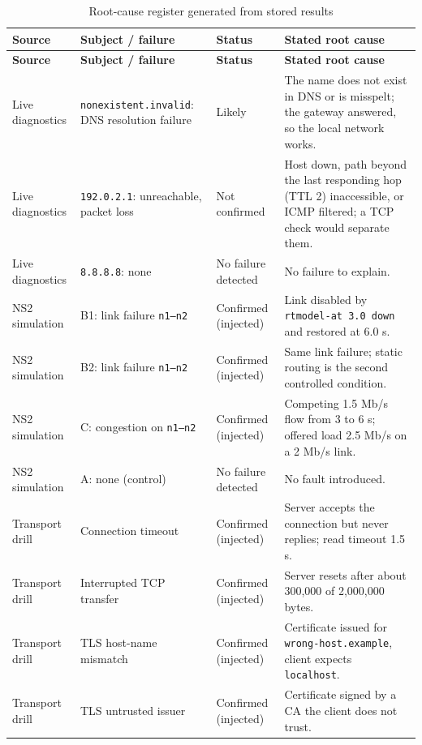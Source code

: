 \documentclass[12pt,a4paper]{report}
\numberwithin{equation}{chapter}
\begin{document}
\begin{longtable}{>{\raggedright\arraybackslash}p{}>{\raggedright\arraybackslash}p{}>{\raggedright\arraybackslash}p{}>{\raggedright\arraybackslash}p{}}
\caption{Root-cause register generated from stored results}\label{tab:register}\\
\toprule
\textbf{Source} & \textbf{Subject / failure} & \textbf{Status} & \textbf{Stated root cause}\\
\midrule
\endfirsthead
\toprule
\textbf{Source} & \textbf{Subject / failure} & \textbf{Status} & \textbf{Stated root cause}\\
\midrule
\endhead
Live diagnostics & \nolinkurl{nonexistent.invalid}: DNS resolution failure & Likely & The name does not exist in DNS or is misspelt; the gateway answered, so the local network works.\\
Live diagnostics & \texttt{192.0.2.1}: unreachable, packet loss & Not confirmed & Host down, path beyond the last responding hop (TTL 2) inaccessible, or ICMP filtered; a TCP check would separate them.\\
Live diagnostics & \texttt{8.8.8.8}: none & No failure detected & No failure to explain.\\
NS2 simulation & B1: link failure \texttt{n1--n2} & Confirmed (injected) & Link disabled by \texttt{rtmodel-at 3.0 down} and restored at 6.0 s.\\
NS2 simulation & B2: link failure \texttt{n1--n2} & Confirmed (injected) & Same link failure; static routing is the second controlled condition.\\
NS2 simulation & C: congestion on \texttt{n1--n2} & Confirmed (injected) & Competing 1.5 Mb/s flow from 3 to 6 s; offered load 2.5 Mb/s on a 2 Mb/s link.\\
NS2 simulation & A: none (control) & No failure detected & No fault introduced.\\
Transport drill & Connection timeout & Confirmed (injected) & Server accepts the connection but never replies; read timeout 1.5 s.\\
Transport drill & Interrupted TCP transfer & Confirmed (injected) & Server resets after about 300,000 of 2,000,000 bytes.\\
Transport drill & TLS host-name mismatch & Confirmed (injected) & Certificate issued for \texttt{wrong-host.example}, client expects \texttt{localhost}.\\
Transport drill & TLS untrusted issuer & Confirmed (injected) & Certificate signed by a CA the client does not trust.\\

\end{longtable}
\end{document}
